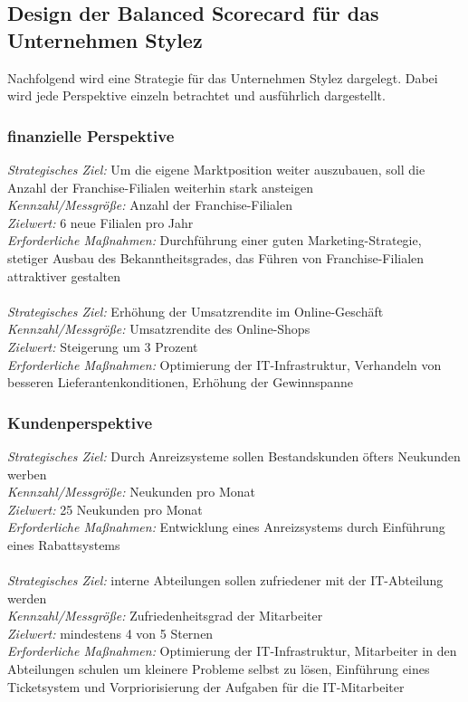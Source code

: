 \subsection{Design der Balanced Scorecard für das Unternehmen Stylez}
Nachfolgend wird eine Strategie für das Unternehmen Stylez dargelegt. Dabei wird
jede Perspektive einzeln betrachtet und ausführlich dargestellt.
\subsubsection{finanzielle Perspektive}
\emph{Strategisches Ziel:} Um die eigene Marktposition weiter auszubauen, soll
die Anzahl der Franchise-Filialen weiterhin stark ansteigen\\
\emph{Kennzahl/Messgröße:} Anzahl der Franchise-Filialen\\
\emph{Zielwert:} 6 neue Filialen pro Jahr \\
\emph{Erforderliche Maßnahmen:} Durchführung einer guten Marketing-Strategie,
stetiger Ausbau des Bekanntheitsgrades, das Führen von Franchise-Filialen
attraktiver gestalten\\\\
\emph{Strategisches Ziel:} Erhöhung der Umsatzrendite im Online-Geschäft\\
\emph{Kennzahl/Messgröße:} Umsatzrendite des Online-Shops\\
\emph{Zielwert:} Steigerung um 3 Prozent \\
\emph{Erforderliche Maßnahmen:} Optimierung der IT-Infrastruktur, Verhandeln
von besseren Lieferantenkonditionen, Erhöhung der Gewinnspanne
\subsubsection{Kundenperspektive}
\emph{Strategisches Ziel:} Durch Anreizsysteme sollen Bestandskunden öfters
Neukunden werben\\
\emph{Kennzahl/Messgröße:} Neukunden pro Monat\\
\emph{Zielwert:} 25 Neukunden pro Monat \\
\emph{Erforderliche Maßnahmen:} Entwicklung eines Anreizsystems durch
Einführung eines Rabattsystems\\\\
\emph{Strategisches Ziel:} interne Abteilungen sollen zufriedener mit der
IT-Abteilung werden\\
\emph{Kennzahl/Messgröße:} Zufriedenheitsgrad der Mitarbeiter\\
\emph{Zielwert:} mindestens 4 von 5 Sternen \\
\emph{Erforderliche Maßnahmen:} Optimierung der IT-Infrastruktur, Mitarbeiter in
den Abteilungen schulen um kleinere Probleme selbst zu lösen, Einführung eines
Ticketsystem und Vorpriorisierung der Aufgaben für die IT-Mitarbeiter
